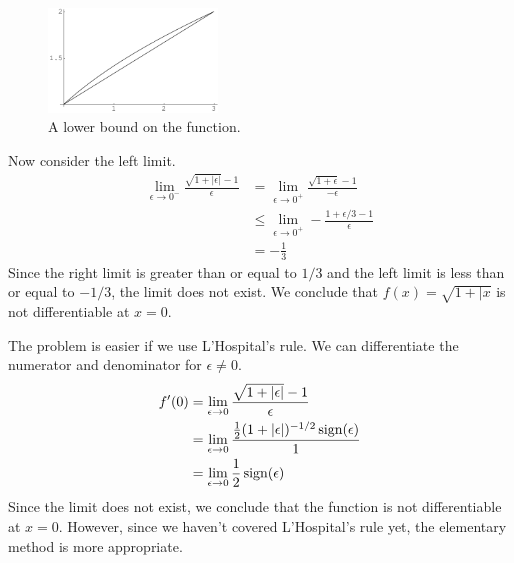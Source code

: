 \begin{Solution}
\begin{enumerate}
    \begin{figure}[tb]
      \begin{center}
        \includegraphics[width=0.4\textwidth]{calculus/differential/sqrt1x1x3}
      \end{center}
      \caption{A lower bound on the function.}
      \label{figure sqrt1x1x3}
    \end{figure}

    Now consider the left limit.
    \begin{align*}
      \lim_{\epsilon \to 0^-} \frac{\sqrt{1 + |\epsilon|} - 1}{\epsilon}
      &= \lim_{\epsilon \to 0^+} \frac{\sqrt{1 + \epsilon} - 1}{-\epsilon}
      \\
      &\leq \lim_{\epsilon \to 0^+} - \frac{1 + \epsilon / 3 - 1}{\epsilon} 
      \\
      &= -\frac{1}{3}
    \end{align*}
    Since the right limit is greater than or equal to $1/3$ and the left 
    limit is less than or equal to $- 1 / 3$, the limit does not exist.
    We conclude that $f(x) = \sqrt{1 + |x}$ is not differentiable 
    at $x = 0$.

    The problem is easier if we use L'Hospital's rule.  We can differentiate
    the numerator and denominator for $\epsilon \neq 0$.
    \begin{align*}
      f'(0) &= \lim_{\epsilon \to 0} \frac{\sqrt{1 + |\epsilon|} - 1}{\epsilon}
      \\
      &= \lim_{\epsilon \to 0} \frac{\frac{1}{2} (1 + |\epsilon|)^{-1/2} \mathop{\mathrm{sign}}\nolimits(\epsilon)}{1}
      \\
      &= \lim_{\epsilon \to 0} \frac{1}{2} \mathop{\mathrm{sign}}\nolimits(\epsilon)
    \end{align*}
    Since the limit does not exist,
    we conclude that the function is not differentiable at $x = 0$.
    However, since we haven't covered L'Hospital's rule yet, the 
    elementary method is more appropriate.
  \end{enumerate}
\end{Solution}



